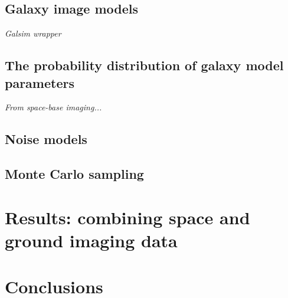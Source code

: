\documentclass[11pt, letterpaper]{article}
\begin{document}
\subsection{Galaxy image models} %
\label{sub:galaxy_image_models}
{\it Galsim wrapper}

\subsection{The probability distribution of galaxy model parameters} %
\label{sub:the_probability_distribution_of_galaxy_model_parameters}
{\it From space-base imaging...}

\subsection{Noise models} %
\label{sub:noise_models}


\subsection{Monte Carlo sampling} %
\label{sub:monte_carlo_sampling}




\section{Results: combining space and ground imaging data} %
\label{sec:results_combining_space_and_ground_imaging_data}



\section{Conclusions} %
\label{sec:conclusions}

\end{document}
